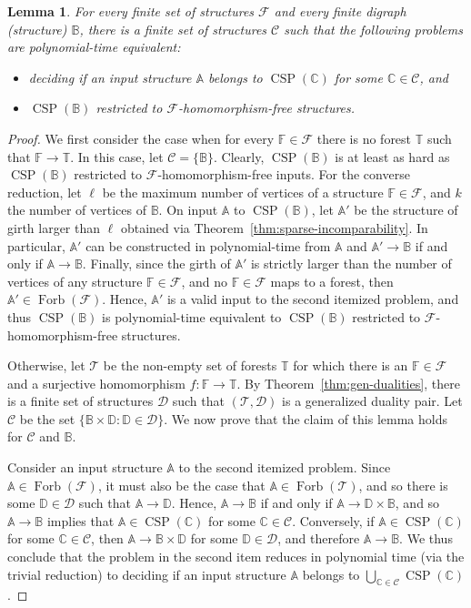 \documentclass{article}
\newtheorem{lemma}[theorem]{Lemma}
\theoremstyle{definition}
\theoremstyle{remark}
\DeclareMathOperator{\Forb}{Forb}
\DeclareMathOperator{\CSP}{CSP}
\newcommand{\bA}{{\mathbb A}}
\newcommand{\bB}{{\mathbb B}}
\newcommand{\bC}{{\mathbb C}}
\newcommand{\bD}{{\mathbb D}}
\newcommand{\bF}{{\mathbb F}}
\newcommand{\bT}{{\mathbb T}}
\newcommand{\calC}{{\mathcal C}}
\newcommand{\calD}{{\mathcal D}}
\newcommand{\calF}{{\mathcal F}}
\newcommand{\calT}{{\mathcal T}}
\begin{document}
\begin{lemma}\label{lem:xDT-T-homfree}
    For every finite set of structures $\calF$ and every finite digraph (structure) $\bB$,
    there is a finite set of structures $\calC$ such that the following problems are
    polynomial-time equivalent:
    \begin{itemize}
        \item deciding if an input structure $\bA$ belongs to $\CSP(\bC)$ for some $\bC\in \calC$, and
        \item $\CSP(\bB)$ restricted to $\calF$-homomorphism-free structures.
    \end{itemize}
\end{lemma}
\begin{proof}
    We first consider the case when for every $\bF\in\calF$ there is no forest $\bT$
    such that $\bF\to \bT$. In this case, let $\calC = \{\bB\}$. Clearly, $\CSP(\bB)$ is at least as
    hard as $\CSP(\bB)$ restricted to  $\calF$-homomorphism-free inputs. 
    For the converse reduction, let $\ell$ be the maximum number of vertices of a
    structure $\bF\in\calF$, and $k$ the number of vertices of $\bB$. On input $\bA$ to $\CSP(\bB)$, 
    let $\bA'$ be the structure of girth larger than $\ell$ obtained via Theorem~\ref{thm:sparse-incomparability}.
    In particular, $\bA'$ can be constructed in polynomial-time from $\bA$ and $\bA'\to \bB$ if and only
    if $\bA\to \bB$. Finally, since the girth of $\bA'$ is strictly larger than the number of vertices
    of any structure $\bF\in \calF$, and no $\bF\in\calF$ maps to a forest, then $\bA'\in\Forb(\calF)$. 
    Hence, $\bA'$ is a valid input to the second itemized problem, and thus 
    $\CSP(\bB)$ is polynomial-time equivalent to $\CSP(\bB)$ restricted to $\calF$-homomorphism-free structures.
    
    Otherwise, let $\calT$ be the non-empty set of  forests $\bT$ for which there is an $\bF\in\calF$
    and a surjective homomorphism $f\colon \bF\to \bT$. By Theorem~\ref{thm:gen-dualities}, there is a
    finite set of structures $\calD$ such that $(\calT, \calD)$ is a generalized duality pair.
    Let $\calC$ be the set $\{\bB\times \bD\colon \bD\in \calD\}$. We now prove that the claim of this lemma
    holds for $\calC$ and $\bB$.
    
    Consider an input structure $\bA$ to the second itemized problem. Since $\bA\in \Forb(\calF)$, 
    it must also be the case that $\bA \in \Forb(\calT)$, and so there is some $\bD\in \calD$ such that
    $\bA\to \bD$. Hence, $\bA\to \bB$ if and only if $\bA\to \bD\times \bB$, and so $\bA\to \bB$ implies
    that $\bA \in \CSP(\bC)$ for some $\bC\in \calC$. Conversely, if $\bA \in \CSP(\bC)$
    for some $\bC\in \calC$, then $\bA\to \bB\times \bD$ for some $\bD\in\calD$, and therefore $\bA\to \bB$. 
    We thus conclude that the problem in the second item reduces in polynomial time
    (via the trivial reduction) to deciding if an input structure $\bA$ belongs to $\bigcup_{\bC\in \calC}\CSP(\bC)$.
    

\end{proof}
\end{document}
